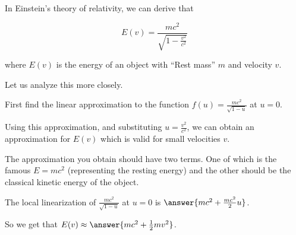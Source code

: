\documentclass{ximera}
\author{Steven Gubkin}
\begin{document}
\begin{exercise}



In Einstein's theory of relativity, we can derive that

$$E(v) = \frac{mc^2}{\sqrt{1-\frac{v^2}{c^2}}}$$

where $E(v)$ is the energy of an object with ``Rest mass'' $m$ and velocity $v$.

Let us analyze this more closely.

First find the linear approximation to the function $f(u) = \frac{mc^2}{\sqrt{1-u}}$ at $u=0$.

Using this approximation, and substituting $u = \frac{v^2}{c^2}$, we can obtain an approximation for $E(v)$ which is valid for small velocities $v$.

The approximation you obtain should have two terms.  One of which is the famous $E = mc^2$ (representing the resting energy) and the other should be the classical kinetic energy of the object.

\begin{prompt}
	The local linearization of $\frac{m c^2}{\sqrt{1-u}}$ at $u=0$ is $\answer{m c^2 +\frac{m c^2}{2}u}$.

	So we get that $E(v) \approx \answer{mc^2+\frac{1}{2}mv^2}$.
\end{prompt}

\end{exercise}
\end{document}
